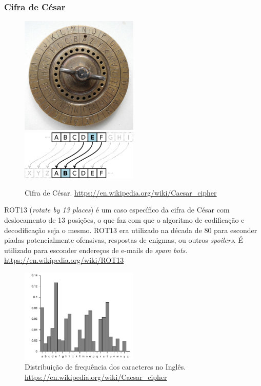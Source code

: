 \begin{frame}[allowframebreaks]
\frametitle{Cifra de César}

\begin{figure}[h]
\centering
\includegraphics[width=0.5\textwidth,height=0.5\textheight,keepaspectratio]{figures/caesar.jpg}
\includegraphics[width=0.5\textwidth,height=0.5\textheight,keepaspectratio]{figures/CaesarCipher.png}
\caption{Cifra de César. \url{https://en.wikipedia.org/wiki/Caesar_cipher}}
\label{fig-cifracaesar}
\end{figure}

ROT13 (\emph{rotate by 13 places}) é um caso específico da cifra de César com deslocamento de 13 posições, o que 
faz com que o algoritmo de codificação e decodificação seja o mesmo.
ROT13 era utilizado na década de 80 para esconder piadas potencialmente ofensivas, respostas de enigmas, ou 
outros \emph{spoilers}. É utilizado para esconder endereços de e-mails de \emph{spam bots}.
\url{https://en.wikipedia.org/wiki/ROT13}

\framebreak

\begin{figure}[h]
\centering
\includegraphics[width=0.5\textwidth,height=0.5\textheight,keepaspectratio]{figures/English_letter_frequency.pdf}
\caption{Distribuição de frequência dos caracteres no Inglês. \url{https://en.wikipedia.org/wiki/Caesar_cipher}}
\label{fig-eng-letters-dist}
\end{figure}

\end{frame}



